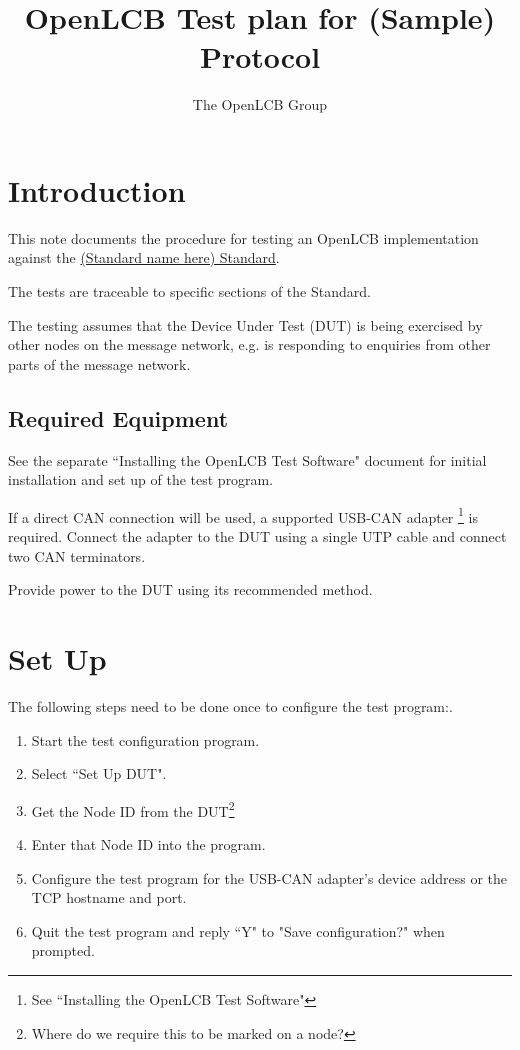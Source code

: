 \documentclass[11pt]{article}
\title{OpenLCB Test plan for (Sample) Protocol}
\author{The OpenLCB Group}
\date{}                                         %
\begin{document}
\maketitle


\section{Introduction}

This note documents the procedure for testing an OpenLCB implementation against the 
\href{url}{(Standard name here) Standard}.

The tests are traceable to specific sections of the Standard.

The testing assumes that the Device Under Test (DUT) is being exercised by other
nodes on the message network, 
e.g. is responding to enquiries from other parts of the message network.

\subsection{Required Equipment}

See the separate ``Installing the OpenLCB Test Software" document for initial installation 
and set up of the test program.

If a direct CAN connection will be used,
a supported USB-CAN adapter
    \footnote{See ``Installing the OpenLCB Test Software"}
is required. 
Connect the adapter to the DUT using a single UTP cable and connect two CAN terminators.

Provide power to the DUT using its recommended method.

\section{Set Up}
The following steps need to be done once to configure the test program:.
\begin{enumerate}
\item Start the test configuration program. 
\item Select ``Set Up DUT".
\item Get the Node ID from the DUT\footnote{Where do we require this to be marked on a node?} 
\item Enter that Node ID into the program.
\item Configure the test program for the USB-CAN adapter's device address
        or the TCP hostname and port.
\item Quit the test program and reply ``Y" to "Save configuration?" when prompted.
\end{enumerate}
\end{document}
